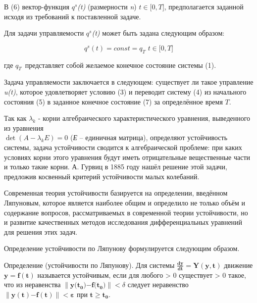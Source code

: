 \begin{multicols}{2}

В (6) вектор-функция \(q^{s}\)\emph{(t)} (размерности \emph{n})
\(t \in \lbrack 0,T\rbrack\), предполагается заданной исходя из
требований к поставленной задаче.

Для задачи управляемости \(q^{s}\)\emph{(t)} может быть задана следующим
образом:

\begin{equation}
q^{s}(t) = const = q_{T\ }\, t \in \lbrack 0,T\rbrack
\end{equation} 

где \(q_{T\ }\) представляет собой желаемое конечное состояние системы
(1).

Задача управляемости заключается в следующем: существует ли такое
управление \emph{u(t)}, которое удовлетворяет условию (3) и переводит
систему (4) из начального состояния (5) в заданное конечное состояние
(7) за определённое время \(T.\)

Так как $\lambda_k$ - корни алгебраического
характеристического уравнения, выведенного из уравнения 
\\ \boldmath$\det(A-\lambda_kE)= 0$ (\emph{Е} -- единичная матрица), определяют устойчивость системы, задача
устойчивости сводится к алгебраической проблеме: при каких условиях
корни этого уравнения будут иметь отрицательные вещественные части и
только такие корни. А. Гурвиц в 1885 году нашёл решение этой задачи,
предложив косвенный критерий устойчивости малых колебаний.

Современная теория устойчивости базируется на определении, введённом
Ляпуновым, которое является наиболее общим и определило не только объём
и содержание вопросов, рассматриваемых в современной теории
устойчивости, но и развитие качественных методов исследования
дифференциальных уравнений для решения этих задач.

Определение устойчивости по Ляпунову формулируется следующим образом.

Определение (устойчивости по Ляпунову). Для системы
\(\frac{\mathbf{dy}}{\mathbf{dt}}\mathbf{= Y}\left( \mathbf{y,t} \right)\)
движение \(\mathbf{y = f(t)}\) называется устойчивым, если для любого
{\varepsilon > 0} существует {\delta > 0} такое,
что из неравенства
\(\left\| \mathbf{y(}\mathbf{t}_{\mathbf{0}}\mathbf{)}\mathbf{-}\mathbf{f(}\mathbf{t}_{\mathbf{0}}\mathbf{)} \right\|{< \delta}\)
следует неравенство
\(\left\| \mathbf{y(t)}\mathbf{-}\mathbf{f(t)} \right\|\mathbf< \pmb{\varepsilon}\)
при \(\mathbf{t}\mathbf{\geq}\mathbf{t}_{\mathbf{0}}\).



\end{multicols}



